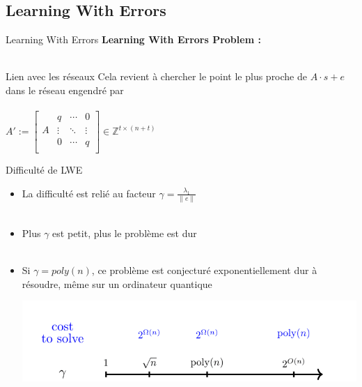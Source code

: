 \documentclass[10 pt, a4paper]{beamer}
\begin{document}
\subsection{Learning With Errors}
\begin{frame}{Learning With Errors}
\textbf{Learning With Errors Problem :} \\ ~ \\

\end{frame}

\begin{frame}{Lien avec les réseaux}
Cela revient à chercher le point le plus proche de $A\cdot s + e$ dans le réseau engendré par \\ ~ \\ $A' := 
 \left[\begin{array}{c|ccc}
&q&\cdots & 0\\
A & \vdots &\ddots & \vdots\\
 & 0 & \cdots &q\\
\end{array}\right]
\in \mathbb{Z}^{t\times (n+t)}$
\end{frame}


\begin{frame}{Difficulté de LWE}
\begin{itemize}
\item<1->[•]La difficulté est relié au facteur $\gamma = \frac{\lambda_1}{\|e\|}$ \\ ~ \\
\item<2->[•] Plus $\gamma$ est petit, plus le problème est dur \\ ~ \\
\item<3->[•] Si $\gamma = poly(n)$, ce problème est conjecturé exponentiellement dur à résoudre, même sur un ordinateur quantique
\begin{center}
\includegraphics[scale=0.30]{gamma_hard.png}
\end{center}
\end{itemize}
\end{frame}
\end{document}
